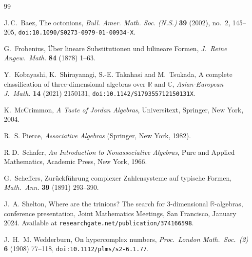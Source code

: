 \documentclass{amsart}
\theoremstyle{plain}
\theoremstyle{definition}
\theoremstyle{remark}
\begin{document}
\begin{thebibliography}{99}

J.\,C.~Baez,
The octonions,
\emph{Bull. Amer. Math. Soc. (N.S.)} \textbf{39} (2002), no.~2, 145--205,
\texttt{doi:10.1090/S0273-0979-01-00934-X}.

G.~Frobenius,
\"Uber lineare Substitutionen und bilineare Formen,
\textit{J.\ Reine Angew.\ Math.} \textbf{84} (1878) 1--63.

Y.~Kobayashi, K.~Shirayanagi, S.-E. Takahasi and M.~Tsukada,
A complete classification of three-dimensional algebras over $\mathbb{R}$
and $\mathbb{C}$,
\textit{Asian-European J.\ Math.} \textbf{14} (2021) 2150131,
\texttt{doi:10.1142/S179355712150131X}.

K.~McCrimmon,
\emph{A Taste of Jordan Algebras},
Universitext, Springer, New York, 2004.

R.~S. Pierce,
\textit{Associative Algebras}
(Springer, New York, 1982).

R.\,D.~Schafer,
\emph{An Introduction to Nonassociative Algebras},
Pure and Applied Mathematics, Academic Press, New York, 1966.

G.~Scheffers,
Zur\"{u}ckf\"{u}hrung complexer Zahlensysteme auf typische Formen,
\textit{Math.\ Ann.} \textbf{39} (1891) 293--390.

J.~A. Shelton,
Where are the trinions? The search for 3-dimensional $\mathbb{R}$-algebras,
conference presentation, Joint Mathematics Meetings,
San Francisco, January 2024.
Available at \texttt{researchgate.net/publication/374166598}.

J.~H.~M. Wedderburn,
On hypercomplex numbers,
\textit{Proc.\ London Math.\ Soc.\ (2)} \textbf{6} (1908) 77--118,
\texttt{doi:10.1112/plms/s2-6.1.77}.

\end{thebibliography}
\end{document}
